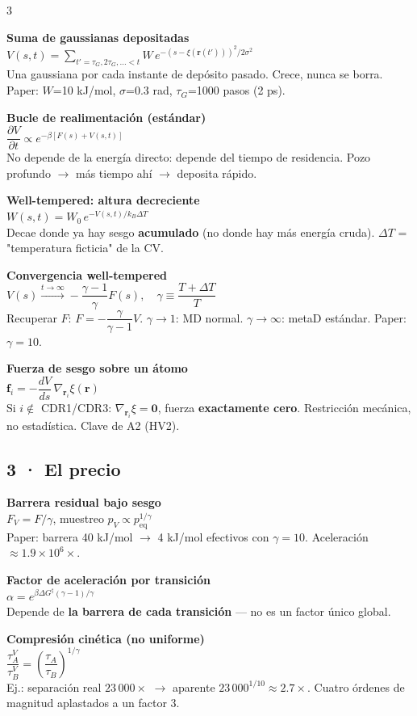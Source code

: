 \documentclass[9pt]{extarticle}
\newcommand{\F}[2]{%
  \par\noindent\textbf{\color{miazul}#1}\\[-0.15em]
  #2\\[0.35em]
}
\begin{document}
\begin{multicols}{3}
\F{Suma de gaussianas depositadas}{
$V(s,t)=\displaystyle\sum_{t'=\tau_G,2\tau_G,\dots<t} W\,e^{-(s-\xi(\mathbf{r}(t')))^2/2\sigma^2}$\\
{\scriptsize Una gaussiana por cada instante de depósito pasado. Crece, nunca se borra. Paper: $W$=10 kJ/mol, $\sigma$=0.3 rad, $\tau_G$=1000 pasos (2 ps).}}

\F{Bucle de realimentación (estándar)}{
$\dfrac{\partial V}{\partial t}\propto e^{-\beta[F(s)+V(s,t)]}$\\
{\scriptsize No depende de la energía directo: depende del tiempo de residencia. Pozo profundo $\to$ más tiempo ahí $\to$ deposita rápido.}}

\F{Well-tempered: altura decreciente}{
$W(s,t)=W_0\,e^{-V(s,t)/k_B\Delta T}$\\
{\scriptsize Decae donde ya hay sesgo \textbf{acumulado} (no donde hay más energía cruda). $\Delta T$ = "temperatura ficticia" de la CV.}}

\F{Convergencia well-tempered}{
$V(s)\xrightarrow{t\to\infty}-\dfrac{\gamma-1}{\gamma}F(s), \quad \gamma\equiv\dfrac{T+\Delta T}{T}$\\
{\scriptsize Recuperar $F$: $F=-\dfrac{\gamma}{\gamma-1}V$. $\gamma\to1$: MD normal. $\gamma\to\infty$: metaD estándar. Paper: $\gamma=10$.}}

\F{Fuerza de sesgo sobre un átomo}{
$\mathbf{f}_i=-\dfrac{dV}{ds}\,\nabla_{\mathbf{r}_i}\xi(\mathbf{r})$\\
{\scriptsize Si $i\notin$ CDR1/CDR3: $\nabla_{\mathbf{r}_i}\xi=\mathbf{0}$, fuerza \textbf{exactamente cero}. Restricción mecánica, no estadística. Clave de A2 (HV2).}}

\subsection*{\small 3 · El precio}

\F{Barrera residual bajo sesgo}{
$F_V=F/\gamma$, \quad muestreo $p_V\propto p_{\text{eq}}^{1/\gamma}$\\
{\scriptsize Paper: barrera 40 kJ/mol $\to$ 4 kJ/mol efectivos con $\gamma=10$. Aceleración $\approx1.9\times10^6\times$.}}

\F{Factor de aceleración por transición}{
$\alpha=e^{\beta\Delta G^{\ddagger}(\gamma-1)/\gamma}$\\
{\scriptsize Depende de \textbf{la barrera de cada transición} — no es un factor único global.}}

\F{Compresión cinética (no uniforme)}{
$\dfrac{\tau_A^V}{\tau_B^V}=\left(\dfrac{\tau_A}{\tau_B}\right)^{1/\gamma}$\\
{\scriptsize Ej.: separación real $23\,000\times$ $\to$ aparente $23\,000^{1/10}\approx2.7\times$. Cuatro órdenes de magnitud aplastados a un factor 3.}}


\end{multicols}
\end{document}
